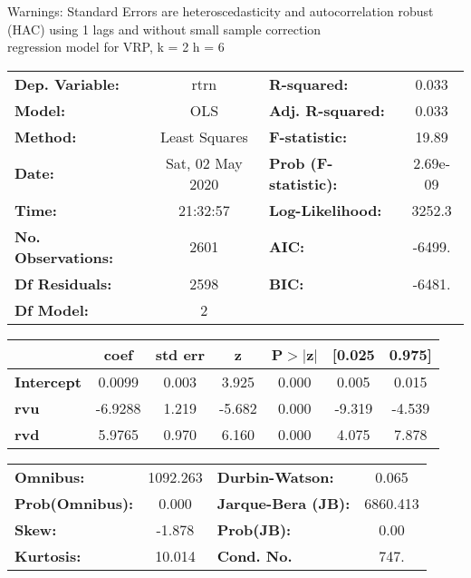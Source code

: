 Warnings: \newline
 [1] Standard Errors are heteroscedasticity and autocorrelation robust (HAC) using 1 lags and without small sample correction\\ 

regression model for VRP, k = 2 h = 6\begin{center}
\begin{tabular}{lclc}
\toprule
\textbf{Dep. Variable:}    &       rtrn       & \textbf{  R-squared:         } &     0.033   \\
\textbf{Model:}            &       OLS        & \textbf{  Adj. R-squared:    } &     0.033   \\
\textbf{Method:}           &  Least Squares   & \textbf{  F-statistic:       } &     19.89   \\
\textbf{Date:}             & Sat, 02 May 2020 & \textbf{  Prob (F-statistic):} &  2.69e-09   \\
\textbf{Time:}             &     21:32:57     & \textbf{  Log-Likelihood:    } &    3252.3   \\
\textbf{No. Observations:} &        2601      & \textbf{  AIC:               } &    -6499.   \\
\textbf{Df Residuals:}     &        2598      & \textbf{  BIC:               } &    -6481.   \\
\textbf{Df Model:}         &           2      & \textbf{                     } &             \\
\bottomrule
\end{tabular}
\begin{tabular}{lcccccc}
                   & \textbf{coef} & \textbf{std err} & \textbf{z} & \textbf{P$> |$z$|$} & \textbf{[0.025} & \textbf{0.975]}  \\
\midrule
\textbf{Intercept} &       0.0099  &        0.003     &     3.925  &         0.000        &        0.005    &        0.015     \\
\textbf{rvu}       &      -6.9288  &        1.219     &    -5.682  &         0.000        &       -9.319    &       -4.539     \\
\textbf{rvd}       &       5.9765  &        0.970     &     6.160  &         0.000        &        4.075    &        7.878     \\
\bottomrule
\end{tabular}
\begin{tabular}{lclc}
\textbf{Omnibus:}       & 1092.263 & \textbf{  Durbin-Watson:     } &    0.065  \\
\textbf{Prob(Omnibus):} &   0.000  & \textbf{  Jarque-Bera (JB):  } & 6860.413  \\
\textbf{Skew:}          &  -1.878  & \textbf{  Prob(JB):          } &     0.00  \\
\textbf{Kurtosis:}      &  10.014  & \textbf{  Cond. No.          } &     747.  \\
\bottomrule
\end{tabular}
\end{center}


